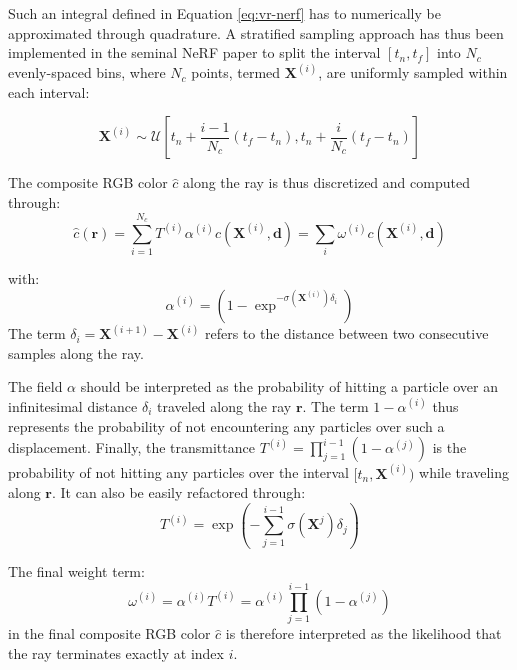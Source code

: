 Such an integral defined in Equation \eqref{eq:vr-nerf} has to numerically be approximated through quadrature. A stratified sampling approach has thus been implemented in the seminal \ac{NeRF} paper \citep{mildenhall2020nerf} to split the interval $[t_{n},t_{f}]$ into $N_c$ evenly-spaced bins, where $N_c$ points, termed $\mathbf{X}^{(i)}$, are uniformly sampled within each interval: 

\begin{equation}
  \mathbf{X}^{(i)} \sim \mathcal{U}\left[ t_{n} + \frac{i-1}{N_c}(t_{f} - t_{n}),t_{n} + \frac{i}{N_c}(t_{f} - t_{n}) \right]
\end{equation}

The composite RGB color $\hat{c}$ along the ray is thus discretized and computed through: 
\begin{equation}
\label{eq:main_nerf}
\hat{c}(\mathbf{r})  = \sum_{i=1}^{N_c}T^{(i)}\alpha^{(i)}c(\mathbf{X}^{(i)},\mathbf{d}) = \sum_{i} \omega^{(i)}c(\mathbf{X}^{(i)},\mathbf{d})
\end{equation}

with: 
\begin{equation}
\alpha^{(i)} = (1-\exp^{-\sigma(\mathbf{X}^{(i)})\delta_{i}})
\end{equation}
The term $\delta_{i} = \mathbf{X}^{(i+1)} - \mathbf{X}^{(i)} $ refers to the distance between two consecutive samples along the ray.

The field $\alpha$ should be interpreted as the probability of hitting a particle over an infinitesimal distance $\delta_{i}$ traveled along the ray $\mathbf{r}$. The term $1 - \alpha^{(i)}$ thus represents the probability of not encountering any particles over such a displacement. Finally, the transmittance $T^{(i)} = \prod_{j=1}^{i-1}(1-\alpha^{(j)})$ is the probability of not hitting any particles over the interval $[t_{n}, \mathbf{X}^{(i)})$ while traveling along $\mathbf{r}$. It can also be easily refactored through: 
\begin{equation}
T^{(i)} = \exp\left( - \sum_{j=1}^{i-1}\sigma(\mathbf{X}^{j})\delta_{j}\right)
\end{equation}

The final weight term: 
\begin{equation}
\label{eq:weights}
    \omega^{(i)} = \alpha^{(i)}T^{(i)} = \alpha^{(i)}\prod_{j=1}^{i-1}(1-\alpha^{(j)})
\end{equation}
in the final composite RGB color $\hat{c}$ is therefore interpreted as the likelihood that the ray terminates exactly at index $i$. 

